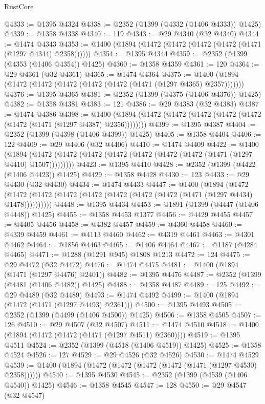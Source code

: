 \begin{lexlean}{RustCore}
\begin{coremodule}
{\begin{coremodule}
{{{{{{{{{{{{{{{{{{{{{{{{{{{{{{{{{{{{{{{{{{{{@4333 := @1395 @4324
@4338 := @2352 (@1399 (@4332 (@1406 @4333)) @1425)
@4339 := @1358 @4338
@4340 := 119
@4343 := @29 @4340 (@32 @4340)
@4344 := @1474 @4343
@4353 := @1400 (@1894 (@1472 (@1472 (@1472 (@1472 (@1471 (@1297 @4344) @2358))))))
@4354 := @1395 @4344
@4359 := @2352 (@1399 (@4353 (@1406 @4354)) @1425)
@4360 := @1358 @4359
@4361 := 120
@4364 := @29 @4361 (@32 @4361)
@4365 := @1474 @4364
@4375 := @1400 (@1894 (@1472 (@1472 (@1472 (@1472 (@1472 (@1471 (@1297 @4365) @2357)))))))
@4376 := @1395 @4365
@4381 := @2352 (@1399 (@4375 (@1406 @4376)) @1425)
@4382 := @1358 @4381
@4383 := 121
@4386 := @29 @4383 (@32 @4383)
@4387 := @1474 @4386
@4398 := @1400 (@1894 (@1472 (@1472 (@1472 (@1472 (@1472 (@1472 (@1471 (@1297 @4387) @2356))))))))
@4399 := @1395 @4387
@4404 := @2352 (@1399 (@4398 (@1406 @4399)) @1425)
@4405 := @1358 @4404
@4406 := 122
@4409 := @29 @4406 (@32 @4406)
@4410 := @1474 @4409
@4422 := @1400
    (@1894 (@1472 (@1472 (@1472 (@1472 (@1472 (@1472 (@1472 (@1471 (@1297 @4410) @1507)))))))))
@4423 := @1395 @4410
@4428 := @2352 (@1399 (@4422 (@1406 @4423)) @1425)
@4429 := @1358 @4428
@4430 := 123
@4433 := @29 @4430 (@32 @4430)
@4434 := @1474 @4433
@4447 := @1400
    (@1894
      (@1472 (@1472 (@1472 (@1472 (@1472 (@1472 (@1472 (@1472 (@1471 (@1297 @4434) @1478))))))))))
@4448 := @1395 @4434
@4453 := @1891 (@1399 (@4447 (@1406 @4448)) @1425)
@4455 := @1358 @4453 @1377
@4456 := @4429 @4455
@4457 := @4405 @4456
@4458 := @4382 @4457
@4459 := @4360 @4458
@4460 := @4339 @4459
@4461 := @4113 @4460
@4462 := @4319 @4461
@4463 := @4301 @4462
@4464 := @1856 @4463
@4465 := @1406 @4464
@4467 := @1187 (@4284 @4465)
@4471 := @1288 (@1291 @945) @1808 @1213
@4472 := 124
@4475 := @29 @4472 (@32 @4472)
@4476 := @1474 @4475
@4481 := @1400 (@1894 (@1471 (@1297 @4476) @2401))
@4482 := @1395 @4476
@4487 := @2352 (@1399 (@4481 (@1406 @4482)) @1425)
@4488 := @1358 @4487
@4489 := 125
@4492 := @29 @4489 (@32 @4489)
@4493 := @1474 @4492
@4499 := @1400 (@1894 (@1472 (@1471 (@1297 @4493) @2361)))
@4500 := @1395 @4493
@4505 := @2352 (@1399 (@4499 (@1406 @4500)) @1425)
@4506 := @1358 @4505
@4507 := 126
@4510 := @29 @4507 (@32 @4507)
@4511 := @1474 @4510
@4518 := @1400 (@1894 (@1472 (@1472 (@1471 (@1297 @4511) @2360))))
@4519 := @1395 @4511
@4524 := @2352 (@1399 (@4518 (@1406 @4519)) @1425)
@4525 := @1358 @4524
@4526 := 127
@4529 := @29 @4526 (@32 @4526)
@4530 := @1474 @4529
@4539 := @1400 (@1894 (@1472 (@1472 (@1472 (@1472 (@1471 (@1297 @4530) @2358))))))
@4540 := @1395 @4530
@4545 := @2352 (@1399 (@4539 (@1406 @4540)) @1425)
@4546 := @1358 @4545
@4547 := 128
@4550 := @29 @4547 (@32 @4547)
}}}}}}}}}}}}}}}}}}}}}}}}}}}}}}}}}}}}}}}}}}}}
\end{coremodule}}
\end{coremodule}
\end{lexlean}
